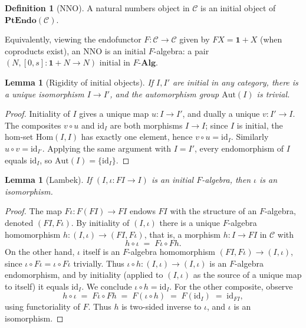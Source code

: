 \documentclass[12pt]{article}
\newtheorem{lemma}[theorem]{Lemma}
\theoremstyle{definition}
\newtheorem{definition}[theorem]{Definition}
\theoremstyle{remark}
\newcommand{\id}{\mathrm{id}}
\newcommand{\Hom}{\mathrm{Hom}}
\newcommand{\PtEndo}{\mathbf{PtEndo}}
\begin{document}
\begin{definition}[NNO]\label{def:nno}
A natural numbers object in $\mathcal{C}$ is an initial object of $\PtEndo(\mathcal{C})$.
\end{definition}

Equivalently, viewing the endofunctor $F\colon \mathcal{C}\to \mathcal{C}$ given by $FX = \mathbf{1}+X$ (when coproducts exist), an NNO is an initial $F$-algebra: a pair $(N,[0,s]\colon \mathbf{1}+N\to N)$ initial in $F\text{-}\mathbf{Alg}$.

\begin{lemma}[Rigidity of initial objects]\label{lem:rigid}
If $I,I'$ are initial in any category, there is a unique isomorphism $I\to I'$, and the automorphism group $\mathrm{Aut}(I)$ is trivial.
\end{lemma}

\begin{proof}
Initiality of $I$ gives a unique map $u\colon I\to I'$, and dually a unique $v\colon I'\to I$. The composites $v\circ u$ and $\id_{I}$ are both morphisms $I\to I$; since $I$ is initial, the hom-set $\Hom(I,I)$ has exactly one element, hence $v\circ u=\id_{I}$. Similarly $u\circ v = \id_{I'}$. Applying the same argument with $I=I'$, every endomorphism of $I$ equals $\id_{I}$, so $\mathrm{Aut}(I)=\{\id_{I}\}$.
\end{proof}

\begin{lemma}[Lambek]\label{lem:lambek}
If $(I,\iota\colon FI\to I)$ is an initial $F$-algebra, then $\iota$ is an isomorphism.
\end{lemma}

\begin{proof}
The map $F\iota\colon F(FI)\to FI$ endows $FI$ with the structure of an $F$-algebra, denoted $(FI,F\iota)$. By initiality of $(I,\iota)$ there is a unique $F$-algebra homomorphism $h\colon (I,\iota)\to (FI,F\iota)$, that is, a morphism $h\colon I\to FI$ in $\mathcal{C}$ with
\[
h\circ \iota \;=\; F\iota\circ Fh.
\]
On the other hand, $\iota$ itself is an $F$-algebra homomorphism $(FI,F\iota)\to(I,\iota)$, since $\iota\circ F\iota = \iota\circ F\iota$ trivially. Thus $\iota\circ h\colon (I,\iota)\to (I,\iota)$ is an $F$-algebra endomorphism, and by initiality (applied to $(I,\iota)$ as the source of a unique map to itself) it equals $\id_{I}$. We conclude $\iota\circ h = \id_{I}$. For the other composite, observe
\[
h\circ \iota \;=\; F\iota\circ Fh \;=\; F(\iota\circ h) \;=\; F(\id_{I}) \;=\; \id_{FI},
\]
using functoriality of $F$. Thus $h$ is two-sided inverse to $\iota$, and $\iota$ is an isomorphism.
\end{proof}
\end{document}
